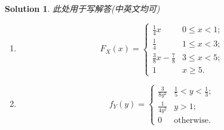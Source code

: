 \documentclass[a4paper,UTF8]{article}
\numberwithin{equation}{section}
\newtheorem*{mySol}{Solution}
\begin{document}
\begin{mySol}
此处用于写解答(中英文均可)

\begin{enumerate}
	
\item 	
\begin{equation}
F_X(x) = 
\begin{cases}
\frac{1}{4}x & 0 \leq x<1;\\
\frac{1}{4} & 1 \leq x<3;\\
\frac{3}{8}x-\frac{7}{8} & 3 \leq x<5;\\ 
1 & x \geq 5 .
\end{cases}
\end{equation}

\item 
\begin{equation}
f_Y(y) =
\begin{cases}
\frac{3}{8y^2} & \frac{1}{5}<y<\frac{1}{3};\\
\frac{1}{4y^2} & y > 1;\\
0 & \mbox{otherwise.}
\end{cases}
\end{equation}


\end{enumerate}
\end{mySol}
\end{document}
